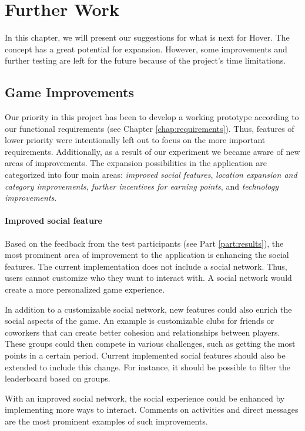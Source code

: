 \section{Further Work}
\label{chap:further_work}
In this chapter, we will present our suggestions for what is next for Hover. The concept has a great potential for expansion. However, some improvements and further testing are left for the future because of the project’s time limitations.

\subsection{Game Improvements}
Our priority in this project has been to develop a working prototype according to our functional requirements (see Chapter \ref{chap:requirements}). Thus, features of lower priority were intentionally left out to focus on the more important requirements. Additionally, as a result of our experiment we became aware of new areas of improvements. The expansion possibilities in the application are categorized into four main areas: \textit{improved social features}, \textit{location expansion and category improvements}, \textit{further incentives for earning points}, and \textit{technology improvements}.

\paragraph*{Improved social feature}
Based on the feedback from the test participants (see Part \ref{part:results}), the most prominent area of improvement to the application is enhancing the social features. The current implementation does not include a social network. Thus, users cannot customize who they want to interact with. A social network would create a more personalized game experience.

In addition to a customizable social network, new features could also enrich the social aspects of the game. An example is customizable clubs for friends or coworkers that can create better cohesion and relationships between players. These groups could then compete in various challenges, such as getting the most points in a certain period. Current implemented social features should also be extended to include this change. For instance, it should be possible to filter the leaderboard based on groups.

With an improved social network, the social experience could be enhanced by implementing more ways to interact. Comments on activities and direct messages are the most prominent examples of such improvements.

